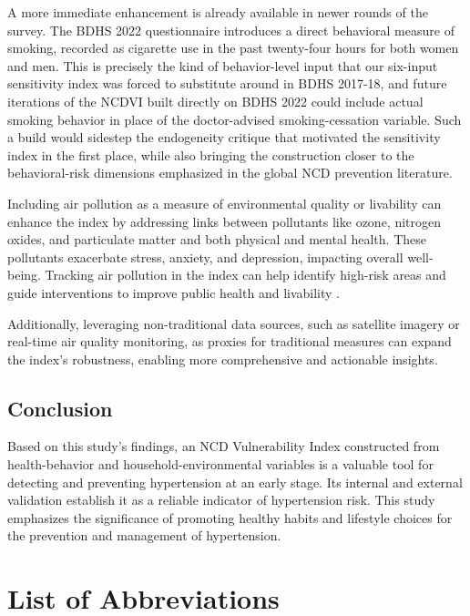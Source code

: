 \documentclass[
  12pt,
  a4paper]{article}
\begin{document}
A more immediate enhancement is already available in newer rounds of the survey. The BDHS 2022 questionnaire introduces a direct behavioral measure of smoking, recorded as cigarette use in the past twenty-four hours for both women and men. This is precisely the kind of behavior-level input that our six-input sensitivity index was forced to substitute around in BDHS 2017-18, and future iterations of the NCDVI built directly on BDHS 2022 could include actual smoking behavior in place of the doctor-advised smoking-cessation variable. Such a build would sidestep the endogeneity critique that motivated the sensitivity index in the first place, while also bringing the construction closer to the behavioral-risk dimensions emphasized in the global NCD prevention literature.

Including air pollution as a measure of environmental quality or livability can enhance the index by addressing links between pollutants like ozone, nitrogen oxides, and particulate matter and both physical and mental health. These pollutants exacerbate stress, anxiety, and depression, impacting overall well-being. Tracking air pollution in the index can help identify high-risk areas and guide interventions to improve public health and livability \citep{carlisle2001exercise, cai2016associations}.

Additionally, leveraging non-traditional data sources, such as satellite imagery or real-time air quality monitoring, as proxies for traditional measures can expand the index's robustness, enabling more comprehensive and actionable insights.

\subsection{Conclusion}\label{conclusion}

Based on this study's findings, an NCD Vulnerability Index constructed from health-behavior and household-environmental variables is a valuable tool for detecting and preventing hypertension at an early stage. Its internal and external validation establish it as a reliable indicator of hypertension risk. This study emphasizes the significance of promoting healthy habits and lifestyle choices for the prevention and management of hypertension.

\section*{List of Abbreviations}\label{list-of-abbreviations}
\end{document}
